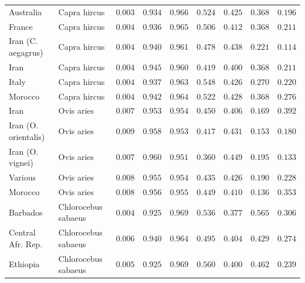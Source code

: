 \documentclass[12pt]{article}
\begin{document}
\begin{table}[tb]
\begin{adjustbox}{width=\textwidth}
\begin{tabular}{||l|l|r||r|r||r|r||r|r||}
            \rowcolor{LIGHTGREY} Australia            & Capra hircus        & $ 0.003$ & $ 0.934$ & $ 0.966$ & $ 0.524$ & $ 0.425$ & $ 0.368$ & $ 0.196$ \\
            \rowcolor{LIGHTGREY} France                                    & Capra hircus          & $ 0.004$ & $ 0.936$ & $ 0.965$ & $ 0.506$ & $ 0.412$ & $ 0.368$ & $ 0.211$ \\
            \rowcolor{LIGHTGREY} Iran (C. aegagrus)                    & Capra hircus          & $ 0.004$ & $ 0.940$ & $ 0.961$ & $ 0.478$ & $ 0.438$ & $ 0.221$ & $ 0.114$ \\
            \rowcolor{LIGHTGREY} Iran                        & Capra hircus          & $ 0.004$ & $ 0.945$ & $ 0.960$ & $ 0.419$ & $ 0.400$ & $ 0.368$ & $ 0.211$ \\
            \rowcolor{LIGHTGREY} Italy                                 & Capra hircus          & $ 0.004$ & $ 0.937$ & $ 0.963$ & $ 0.548$ & $ 0.426$ & $ 0.270$ & $ 0.220$ \\
            \rowcolor{LIGHTGREY} Morocco                                 & Capra hircus          & $ 0.004$ & $ 0.942$ & $ 0.964$ & $ 0.522$ & $ 0.428$ & $ 0.368$ & $ 0.276$ \\
            Iran           & Ovis aries & $ 0.007$ & $ 0.953$ & $ 0.954$ & $ 0.450$ & $ 0.406$ & $ 0.169$ & $ 0.392$ \\
            Iran (O. orientalis)  & Ovis aries & $ 0.009$ & $ 0.958$ & $ 0.953$ & $ 0.417$ & $ 0.431$ & $ 0.153$ & $ 0.180$ \\
            Iran (O. vignei)           & Ovis aries & $ 0.007$ & $ 0.960$ & $ 0.951$ & $ 0.360$ & $ 0.449$ & $ 0.195$ & $ 0.133$ \\
            Various             & Ovis aries & $ 0.008$ & $ 0.955$ & $ 0.954$ & $ 0.435$ & $ 0.426$ & $ 0.190$ & $ 0.228$ \\
            Morocco              & Ovis aries & $ 0.008$ & $ 0.956$ & $ 0.955$ & $ 0.449$ & $ 0.410$ & $ 0.136$ & $ 0.353$ \\
            \rowcolor{LIGHTGREY} Barbados              & Chlorocebus sabaeus & $ 0.004$ & $ 0.925$ & $ 0.969$ & $ 0.536$ & $ 0.377$ & $ 0.565$ & $ 0.306$ \\
            \rowcolor{LIGHTGREY} Central Afr. Rep.       & Chlorocebus sabaeus & $ 0.006$ & $ 0.940$ & $ 0.964$ & $ 0.495$ & $ 0.404$ & $ 0.429$ & $ 0.274$ \\
            \rowcolor{LIGHTGREY} Ethiopia        & Chlorocebus sabaeus & $ 0.005$ & $ 0.925$ & $ 0.969$ & $ 0.560$ & $ 0.400$ & $ 0.462$ & $ 0.239$ \\

\end{tabular}
\end{adjustbox}
\end{table}
\end{document}
